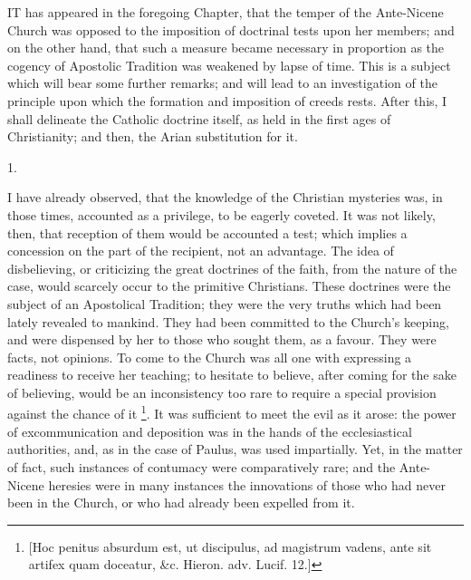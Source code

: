 

IT has appeared in the foregoing
Chapter, that the temper of the Ante-Nicene Church was opposed to the
imposition of doctrinal tests upon her members; and on the other hand,
that such a measure became necessary in proportion as the cogency of
Apostolic Tradition was weakened by lapse of time. This is a subject
which will bear some further remarks; and will lead to an
investigation of the principle upon which the formation and imposition
of creeds rests. After this, I shall delineate the Catholic doctrine
itself, as held in the first ages of Christianity; and then, the Arian
substitution for it.

1.

I have already observed, that the knowledge of the Christian
mysteries was, in those times, accounted as a privilege, to be eagerly
coveted. It was not likely, then, that reception of them would
be accounted a test; which implies a concession on the part of the
recipient, not an advantage. The idea of disbelieving, or criticizing
the great doctrines of the faith, from the nature of the case, would
scarcely occur to the primitive Christians. These doctrines were the
subject of an Apostolical Tradition; they were the very truths which
had been lately revealed to mankind. They had been committed to the
Church's keeping, and were dispensed by her to those who sought them,
as a favour. They were facts, not opinions. To come to the Church was
all one with expressing a readiness to receive her teaching; to
hesitate to believe, after coming for the sake of believing, would be
an inconsistency too rare to require a special provision against the
chance of it \footnote{[Hoc penitus absurdum est, ut discipulus, ad magistrum vadens,
ante sit artifex quam doceatur, \&c. Hieron. adv. Lucif. 12.]}. It was
sufficient to meet the evil as it arose: the power of excommunication
and deposition was in the hands of the ecclesiastical authorities,
and, as in the case of Paulus, was used impartially. Yet, in the
matter of fact, such instances of contumacy were comparatively rare;
and the Ante-Nicene heresies were in many instances the innovations of
those who had never been in the Church, or who had already been
expelled from it.

